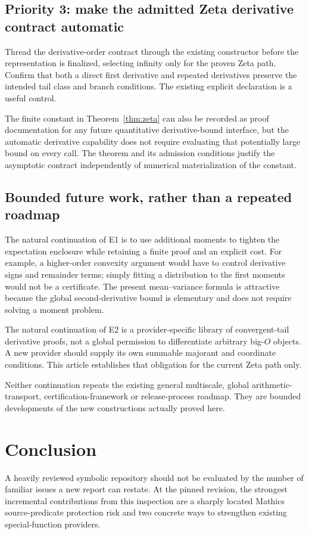 \documentclass[11pt,a4paper]{article}
\begin{document}
\subsection{Priority 3: make the admitted Zeta derivative contract automatic}
Thread the derivative-order contract through the existing constructor before the representation is finalized, selecting infinity only for the proven Zeta path. Confirm that both a direct first derivative and repeated derivatives preserve the intended tail class and branch conditions. The existing explicit declaration is a useful control.

The finite constant in Theorem~\ref{thm:zeta} can also be recorded as proof documentation for any future quantitative derivative-bound interface, but the automatic derivative capability does not require evaluating that potentially large bound on every call. The theorem and its admission conditions justify the asymptotic contract independently of numerical materialization of the constant.

\subsection{Bounded future work, rather than a repeated roadmap}
The natural continuation of E1 is to use additional moments to tighten the expectation enclosure while retaining a finite proof and an explicit cost. For example, a higher-order convexity argument would have to control derivative signs and remainder terms; simply fitting a distribution to the first moments would not be a certificate. The present mean--variance formula is attractive because the global second-derivative bound is elementary and does not require solving a moment problem.

The natural continuation of E2 is a provider-specific library of convergent-tail derivative proofs, not a global permission to differentiate arbitrary big-$O$ objects. A new provider should supply its own summable majorant and coordinate conditions. This article establishes that obligation for the current Zeta path only.

Neither continuation repeats the existing general multiscale, global arithmetic-transport, certification-framework or release-process roadmap. They are bounded developments of the new constructions actually proved here.

\section{Conclusion}
A heavily reviewed symbolic repository should not be evaluated by the number of familiar issues a new report can restate. At the pinned revision, the strongest incremental contributions from this inspection are a sharply located Mathics source-predicate protection risk and two concrete ways to strengthen existing special-function providers.
\end{document}
